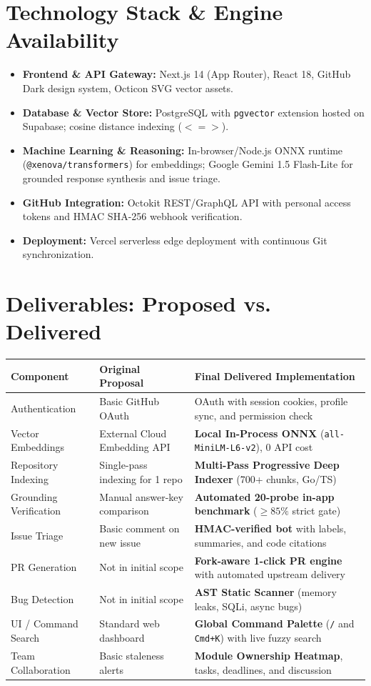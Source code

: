 \documentclass[11pt,a4paper]{article}
\begin{document}
\section{Technology Stack \& Engine Availability}
\begin{itemize}
    \item \textbf{Frontend \& API Gateway:} Next.js 14 (App Router), React 18, GitHub Dark design system, Octicon SVG vector assets.
    \item \textbf{Database \& Vector Store:} PostgreSQL with \texttt{pgvector} extension hosted on Supabase; cosine distance indexing ($<=>$).
    \item \textbf{Machine Learning \& Reasoning:} In-browser/Node.js ONNX runtime (\texttt{@xenova/transformers}) for embeddings; Google Gemini 1.5 Flash-Lite for grounded response synthesis and issue triage.
    \item \textbf{GitHub Integration:} Octokit REST/GraphQL API with personal access tokens and HMAC SHA-256 webhook verification.
    \item \textbf{Deployment:} Vercel serverless edge deployment with continuous Git synchronization.
\end{itemize}

\section{Deliverables: Proposed vs. Delivered}
\begin{table}[h]
\centering
\small
\begin{tabular}{@{}lll@{}}
\toprule
\textbf{Component} & \textbf{Original Proposal} & \textbf{Final Delivered Implementation} \\
\midrule
Authentication & Basic GitHub OAuth & OAuth with session cookies, profile sync, and permission check \\
Vector Embeddings & External Cloud Embedding API & \textbf{Local In-Process ONNX} (\texttt{all-MiniLM-L6-v2}), 0 API cost \\
Repository Indexing & Single-pass indexing for 1 repo & \textbf{Multi-Pass Progressive Deep Indexer} (700+ chunks, Go/TS) \\
Grounding Verification & Manual answer-key comparison & \textbf{Automated 20-probe in-app benchmark} ($\ge 85\%$ strict gate) \\
Issue Triage & Basic comment on new issue & \textbf{HMAC-verified bot} with labels, summaries, and code citations \\
PR Generation & Not in initial scope & \textbf{Fork-aware 1-click PR engine} with automated upstream delivery \\
Bug Detection & Not in initial scope & \textbf{AST Static Scanner} (memory leaks, SQLi, async bugs) \\
UI / Command Search & Standard web dashboard & \textbf{Global Command Palette} (\texttt{/} and \texttt{Cmd+K}) with live fuzzy search \\
Team Collaboration & Basic staleness alerts & \textbf{Module Ownership Heatmap}, tasks, deadlines, and discussion \\
\bottomrule
\end{tabular}
\end{table}
\end{document}
